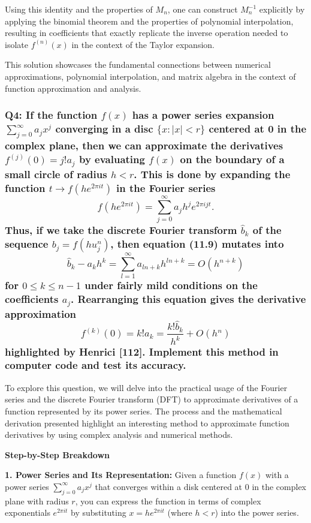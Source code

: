 \documentclass[8pt]{article}
\begin{document}
Using this identity and the properties of \( M_n \), one can construct \( M_n^{-1} \) explicitly by applying the binomial theorem and the properties of polynomial interpolation, resulting in coefficients that exactly replicate the inverse operation needed to isolate \( f^{(n)}(x) \) in the context of the Taylor expansion.

This solution showcases the fundamental connections between numerical approximations, polynomial interpolation, and matrix algebra in the context of function approximation and analysis.

\subsubsection*{Q4: If the function \( f(x) \) has a power series expansion \( \sum_{j=0}^{\infty} a_j x^j \) converging in a disc \(\{x : |x| < r\}\) centered at 0 in the complex plane, then we can approximate the derivatives \( f^{(j)}(0) = j!a_j \) by evaluating \( f(x) \) on the boundary of a small circle of radius \( h < r \). This is done by expanding the function \( t \rightarrow f(he^{2\pi i t}) \) in the Fourier series
\[
f(he^{2\pi it}) = \sum_{j=0}^{\infty} a_j h^j e^{2\pi i jt}.
\]
Thus, if we take the discrete Fourier transform \( \hat{b}_k \) of the sequence \( b_j = f(hu_j^n) \), then equation (11.9) mutates into
\[
\hat{b}_k - a_k h^k = \sum_{l=1}^{\infty} a_{ln+k} h^{ln+k} = O(h^{n+k})
\]
for \( 0 \leq k \leq n - 1 \) under fairly mild conditions on the coefficients \( a_j \). Rearranging this equation gives the derivative approximation
\[
f^{(k)}(0) = k! a_k = \frac{k! \hat{b}_k}{h^k} + O(h^n)
\]
highlighted by Henrici [112]. Implement this method in computer code and test its accuracy.}

To explore this question, we will delve into the practical usage of the Fourier series and the discrete Fourier transform (DFT) to approximate derivatives of a function represented by its power series. The process and the mathematical derivation presented highlight an interesting method to approximate function derivatives by using complex analysis and numerical methods.

\textbf{Step-by-Step Breakdown}

\textbf{1. Power Series and Its Representation:}
   Given a function \( f(x) \) with a power series \( \sum_{j=0}^{\infty} a_j x^j \) that converges within a disk centered at 0 in the complex plane with radius \( r \), you can express the function in terms of complex exponentials \( e^{2\pi it} \) by substituting \( x = he^{2\pi it} \) (where \( h < r \)) into the power series.
\end{document}
